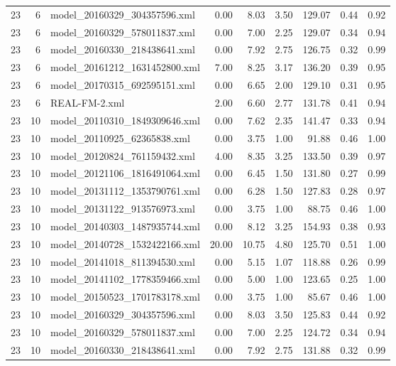 \begin{table}[ht]
\begin{tabular}{rrlrrrrrr}
   23 &   6 & model\_20160329\_304357596.xml & 0.00 & 8.03 & 3.50 & 129.07 & 0.44 & 0.92 \\ 
   23 &   6 & model\_20160329\_578011837.xml & 0.00 & 7.00 & 2.25 & 129.07 & 0.34 & 0.94 \\ 
   23 &   6 & model\_20160330\_218438641.xml & 0.00 & 7.92 & 2.75 & 126.75 & 0.32 & 0.99 \\ 
   23 &   6 & model\_20161212\_1631452800.xml & 7.00 & 8.25 & 3.17 & 136.20 & 0.39 & 0.95 \\ 
   23 &   6 & model\_20170315\_692595151.xml & 0.00 & 6.65 & 2.00 & 129.10 & 0.31 & 0.95 \\ 
   23 &   6 & REAL-FM-2.xml & 2.00 & 6.60 & 2.77 & 131.78 & 0.41 & 0.94 \\ 
   23 &  10 & model\_20110310\_1849309646.xml & 0.00 & 7.62 & 2.35 & 141.47 & 0.33 & 0.94 \\ 
   23 &  10 & model\_20110925\_62365838.xml & 0.00 & 3.75 & 1.00 & 91.88 & 0.46 & 1.00 \\ 
   23 &  10 & model\_20120824\_761159432.xml & 4.00 & 8.35 & 3.25 & 133.50 & 0.39 & 0.97 \\ 
   23 &  10 & model\_20121106\_1816491064.xml & 0.00 & 6.45 & 1.50 & 131.80 & 0.27 & 0.99 \\ 
   23 &  10 & model\_20131112\_1353790761.xml & 0.00 & 6.28 & 1.50 & 127.83 & 0.28 & 0.97 \\ 
   23 &  10 & model\_20131122\_913576973.xml & 0.00 & 3.75 & 1.00 & 88.75 & 0.46 & 1.00 \\ 
   23 &  10 & model\_20140303\_1487935744.xml & 0.00 & 8.12 & 3.25 & 154.93 & 0.38 & 0.93 \\ 
   23 &  10 & model\_20140728\_1532422166.xml & 20.00 & 10.75 & 4.80 & 125.70 & 0.51 & 1.00 \\ 
   23 &  10 & model\_20141018\_811394530.xml & 0.00 & 5.15 & 1.07 & 118.88 & 0.26 & 0.99 \\ 
   23 &  10 & model\_20141102\_1778359466.xml & 0.00 & 5.00 & 1.00 & 123.65 & 0.25 & 1.00 \\ 
   23 &  10 & model\_20150523\_1701783178.xml & 0.00 & 3.75 & 1.00 & 85.67 & 0.46 & 1.00 \\ 
   23 &  10 & model\_20160329\_304357596.xml & 0.00 & 8.03 & 3.50 & 125.83 & 0.44 & 0.92 \\ 
   23 &  10 & model\_20160329\_578011837.xml & 0.00 & 7.00 & 2.25 & 124.72 & 0.34 & 0.94 \\ 
   23 &  10 & model\_20160330\_218438641.xml & 0.00 & 7.92 & 2.75 & 131.88 & 0.32 & 0.99 \\ 

\end{tabular}
\end{table}
